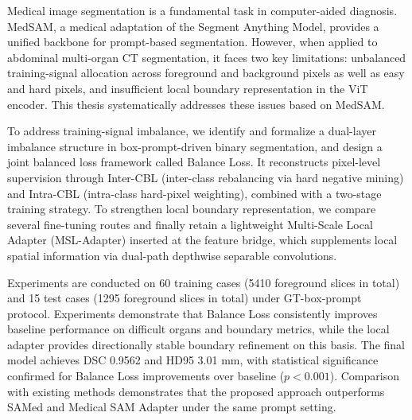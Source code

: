Medical image segmentation is a fundamental task in computer-aided diagnosis. MedSAM, a medical adaptation of the Segment Anything Model, provides a unified backbone for prompt-based segmentation. However, when applied to abdominal multi-organ CT segmentation, it faces two key limitations: unbalanced training-signal allocation across foreground and background pixels as well as easy and hard pixels, and insufficient local boundary representation in the ViT encoder. This thesis systematically addresses these issues based on MedSAM.

To address training-signal imbalance, we identify and formalize a dual-layer imbalance structure in box-prompt-driven binary segmentation, and design a joint balanced loss framework called Balance Loss. It reconstructs pixel-level supervision through Inter-CBL (inter-class rebalancing via hard negative mining) and Intra-CBL (intra-class hard-pixel weighting), combined with a two-stage training strategy. To strengthen local boundary representation, we compare several fine-tuning routes and finally retain a lightweight Multi-Scale Local Adapter (MSL-Adapter) inserted at the feature bridge, which supplements local spatial information via dual-path depthwise separable convolutions.

Experiments are conducted on 60 training cases (5410 foreground slices in total) and 15 test cases (1295 foreground slices in total) under GT-box-prompt protocol. Experiments demonstrate that Balance Loss consistently improves baseline performance on difficult organs and boundary metrics, while the local adapter provides directionally stable boundary refinement on this basis. The final model achieves DSC 0.9562 and HD95 3.01 mm, with statistical significance confirmed for Balance Loss improvements over baseline ($p<0.001$). Comparison with existing methods demonstrates that the proposed approach outperforms SAMed and Medical SAM Adapter under the same prompt setting.
